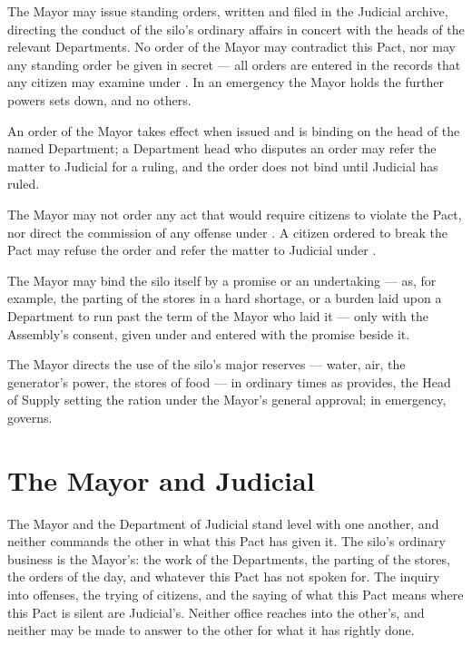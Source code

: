 The Mayor may issue standing orders, written and filed in the Judicial archive, directing the conduct of the silo's ordinary affairs in concert with the heads of the relevant Departments. No order of the Mayor may contradict this Pact, nor may any standing order be given in secret --- all orders are entered in the records that any citizen may examine under . In an emergency the Mayor holds the further powers  sets down, and no others.

\begin{clauses}
\item An order of the Mayor takes effect when issued and is binding on the head of the named Department; a Department head who disputes an order may refer the matter to Judicial for a ruling, and the order does not bind until Judicial has ruled.
\item The Mayor may not order any act that would require citizens to violate the Pact, nor direct the commission of any offense under . A citizen ordered to break the Pact may refuse the order and refer the matter to Judicial under .
\item The Mayor may bind the silo itself by a promise or an undertaking --- as, for example, the parting of the stores in a hard shortage, or a burden laid upon a Department to run past the term of the Mayor who laid it --- only with the Assembly's consent, given under  and entered with the promise beside it.
\item The Mayor directs the use of the silo's major reserves --- water, air, the generator's power, the stores of food --- in ordinary times as  provides, the Head of Supply setting the ration under the Mayor's general approval; in emergency,  governs.
\end{clauses}

\section{The Mayor and Judicial}
\label{sec:mayor:mayor-and-judicial}

The Mayor and the Department of Judicial stand level with one another, and neither commands the other in what this Pact has given it. The silo's ordinary business is the Mayor's: the work of the Departments, the parting of the stores, the orders of the day, and whatever this Pact has not spoken for. The inquiry into offenses, the trying of citizens, and the saying of what this Pact means where this Pact is silent are Judicial's. Neither office reaches into the other's, and neither may be made to answer to the other for what it has rightly done.

